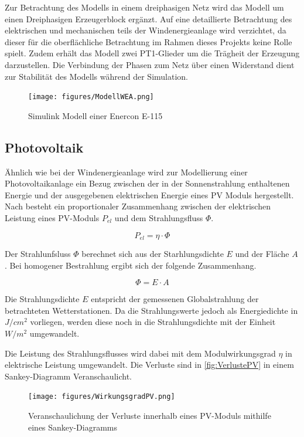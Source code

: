 Zur Betrachtung des Modells in einem dreiphasigen Netz wird das Modell um einen Dreiphasigen Erzeugerblock ergänzt. Auf eine detaillierte Betrachtung des elektrischen und mechanischen teils der Windenergieanlage wird verzichtet, da dieser für die oberflächliche Betrachtung im Rahmen dieses Projekts keine Rolle spielt. Zudem erhält das Modell zwei PT1-Glieder um die Trägheit der Erzeugung darzustellen. Die Verbindung der Phasen zum Netz über einen Widerstand dient zur Stabilität des Modells während der Simulation.

\begin{figure}[H]
	\centering
	\texttt{[image: figures/ModellWEA.png]}
	\caption{Simulink Modell einer Enercon E-115}
	\label{fig:e115}
\end{figure}

\subsection{Photovoltaik}

Ähnlich wie bei der Windenergieanlage wird zur Modellierung einer Photovoltaikanlage ein Bezug zwischen der in der Sonnenstrahlung enthaltenen Energie und der ausgegebenen elektrischen Energie eines PV Moduls hergestellt. Nach \cite{PV} besteht ein proportionaler Zusammenhang zwischen der elektrischen Leistung eines PV-Moduls $P_{el}$ und dem Strahlungsfluss $\Phi$. 

\begin{equation}
	P_{el} = \eta \cdot \Phi
\end{equation}

Der Strahlunfsluss $\Phi$ berechnet sich aus der Starhlungsdichte $E$ und der Fläche $A$. Bei homogener Bestrahlung ergibt sich der folgende Zusammenhang.

\begin{equation}
	\Phi = E \cdot A
\end{equation}

Die Strahlungsdichte $E$ entspricht der gemessenen Globalstrahlung der betrachteten Wetterstationen. Da die Strahlungswerte jedoch als Energiedichte in $J/cm^2$ vorliegen, werden diese noch in die Strahlungsdichte mit der Einheit $W/m^2$ umgewandelt.

Die Leistung des Strahlungsflusses wird dabei mit dem Modulwirkungsgrad $\eta$ in elektrische Leistung umgewandelt. Die Verluste sind in \autoref{fig:VerlustePV} in einem Sankey-Diagramm Veranschaulicht. 

\begin{figure}[H]
	\centering
	\texttt{[image: figures/WirkungsgradPV.png]}
	\caption{Veranschaulichung der Verluste innerhalb eines PV-Moduls mithilfe eines Sankey-Diagramms \cite{VerlustePV}}
	\label{fig:VerlustePV}
\end{figure}

